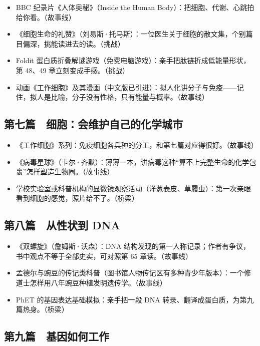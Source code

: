 \begin{itemize}[itemsep=2pt]
\item BBC 纪录片《人体奥秘》（Inside the Human Body）：把细胞、代谢、心跳拍给你看。（故事线）
\item 《细胞生命的礼赞》（刘易斯·托马斯）：一位医生关于细胞的散文集，个别篇目偏深，挑能读进去的读。（挑战）
\item Foldit 蛋白质折叠解谜游戏（免费电脑游戏）：亲手把肽链折成低能量形状，第 48、49 章立刻变成手感。（挑战）
\item 动画《工作细胞》及其漫画（中文版已引进）：拟人化讲分子与免疫——记住，拟人是比喻，分子没有性格，只有能量与概率。（故事线）
\end{itemize}

\subsection*{第七篇　细胞：会维护自己的化学城市}

\begin{itemize}[itemsep=2pt]
\item 《工作细胞》系列：免疫细胞各兵种的分工，和第七篇对应得很好。（故事线）
\item 《病毒星球》（卡尔·齐默）：薄薄一本，讲病毒这种“算不上完整生命的化学包裹”怎样塑造生物圈。（故事线）
\item 学校实验室或科普机构的显微镜观察活动（洋葱表皮、草履虫）：第一次亲眼看到细胞的感觉，照片给不了。（桥梁）
\end{itemize}

\subsection*{第八篇　从性状到 DNA}

\begin{itemize}[itemsep=2pt]
\item 《双螺旋》（詹姆斯·沃森）：DNA 结构发现的第一人称记录；作者有争议，书中观点不等于全部史实，可对照第 65 章读。（故事线）
\item 孟德尔与豌豆的传记类科普（图书馆人物传记区有多种青少年版本）：一个修道士怎样用八年豌豆种植发明遗传学。（故事线）
\item PhET 的基因表达基础模拟：亲手把一段 DNA 转录、翻译成蛋白质，为第九篇热身。（桥梁）
\end{itemize}

\subsection*{第九篇　基因如何工作}

